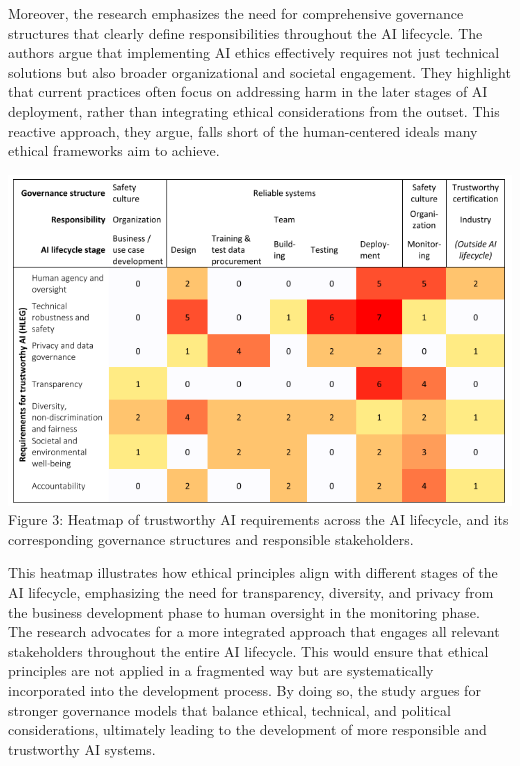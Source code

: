 \documentclass[a4paper, 12pt]{article}
\begin{document}
Moreover, the research emphasizes the need for comprehensive governance structures that clearly define responsibilities throughout the AI lifecycle. The authors argue that implementing AI ethics effectively requires not just technical solutions but also broader organizational and societal engagement. They highlight that current practices often focus on addressing harm in the later stages of AI deployment, rather than integrating ethical considerations from the outset. This reactive approach, they argue, falls short of the human-centered ideals many ethical frameworks aim to achieve.

\begin{center}
\includegraphics[scale=0.9]{Figure3.png}\\
\small Figure 3: Heatmap of trustworthy AI requirements across the AI lifecycle, and its corresponding governance structures and responsible stakeholders. \normalsize
\end{center}

This heatmap illustrates how ethical principles align with different stages of the AI lifecycle, emphasizing the need for transparency, diversity, and privacy from the business development phase to human oversight in the monitoring phase.\\

The research advocates for a more integrated approach that engages all relevant stakeholders throughout the entire AI lifecycle. This would ensure that ethical principles are not applied in a fragmented way but are systematically incorporated into the development process. By doing so, the study argues for stronger governance models that balance ethical, technical, and political considerations, ultimately leading to the development of more responsible and trustworthy AI systems.\\
\end{document}
